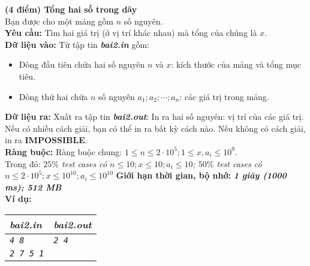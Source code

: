 \begin{ex}
	\textbf{(4 điểm) Tổng hai số trong dãy}\\
	Bạn được cho một mảng gồm $n$ số nguyên. \\
	\textbf{Yêu cầu: } Tìm hai giá trị (ở vị trí khác nhau) mà tổng của chúng là $x$.\\
	\textbf{Dữ liệu vào: } Từ tập tin \textbf{\textit{bai2.in}} gồm: 
	\begin{itemize}
		\item Dòng đầu tiên chứa hai số nguyên $n$ và $x$: kích thước của mảng và tổng mục tiêu. 
		\item Dòng thứ hai chứa $n$ số nguyên $a_1; a_2; \cdots; a_n$: các giá trị trong mảng. 
	\end{itemize}
	\textbf{Dữ liệu ra: } Xuất ra tập tin \textbf{\textit{bai2.out}}: 
	In ra hai số nguyên: vị trí của các giá trị. Nếu có nhiều cách giải, bạn có thể in ra bất kỳ cách nào. Nếu không có cách giải, in ra \textbf{IMPOSSIBLE}. \\
	\textbf{Ràng buộc: } Ràng buộc chung: $1 \leq n \leq 2 \cdot 10^5; 1 \leq x , a_i \leq 10^9$. \\
	Trong đó: \textit{$25\%$ test cases có $n \leq 10; x \leq 10; a_i \leq 10$; $50\%$ test cases có $n \leq 2\cdot 10^5; x \leq 10^{10}; a_i \leq 10^{10} $}
		\textbf{Giới hạn thời gian, bộ nhớ: } \textbf{\textit{1 giây (1000 ms); 512 MB}} \\
	\textbf{Ví dụ: }
	\begin{center}
		\begin{tabular}{|l|l|}
			\hline
			\textbf{\textsf{\textit{bai2.in}}} & \textbf{\textsf{\textit{bai2.out}}} \\ %
			\hline
			\textit{\texttt{4 8}} & \textit{\texttt{2 4}} \\ %
			\textit{\texttt{2 7 5 1}} &  \\ %
			\hline
		\end{tabular}
	\end{center}
\end{ex}

